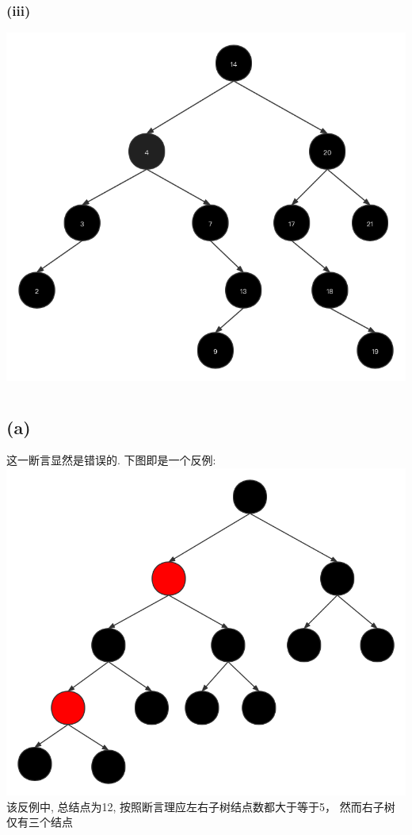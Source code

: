 \documentclass{article}
\begin{document}
\subsubsection{(iii)}
\includegraphics[scale=0.4]{Figure4.png}


\section{}
\subsection{(a)}
这一断言显然是错误的. 下图即是一个反例: \\
\includegraphics[scale=0.25]{Figure1.png} \\
该反例中, 总结点为12, 按照断言理应左右子树结点数都大于等于5， 然而右子树仅有三个结点
\end{document}
